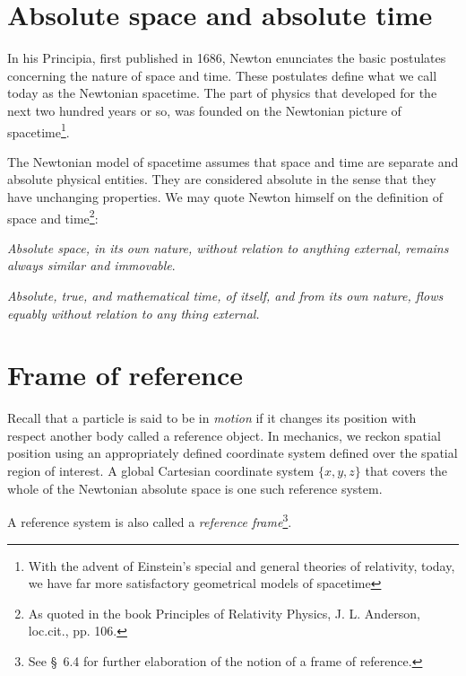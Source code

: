 \section{Absolute space and absolute time}

In his {Principia}, first published in 1686, Newton 
enunciates the basic postulates concerning {the nature 
of 
space and time}. These postulates define what we call 
today 
as the Newtonian spacetime. The part of physics that 
developed for the next two hundred years or so, was 
founded 
on the Newtonian picture of spacetime\footnote{With 
the 
advent of Einstein's special and general theories of 
relativity, today, we have far more satisfactory 
geometrical 
models of spacetime}.

The Newtonian model of spacetime assumes that space and
time are separate and absolute physical entities. They 
are 
considered absolute in the sense that they have 
unchanging
properties. We may quote Newton himself on the 
definition of
space and time\footnote{As quoted in the book 
{Principles of
Relativity Physics}, J. L. Anderson, loc.cit., pp. 
106.}:

{}
\textit{Absolute space, in its own nature, without 
relation
to anything external, remains always similar and
immovable}.

\textit{Absolute, true, and
mathematical time, of itself, and from its own nature, 
flows
equably without relation to any thing external.}

\vspace{-.3cm}

\section{Frame of reference}

Recall that a particle is said to be in \textsl{motion} 
if
it changes its position with respect another body 
called a
reference object. In mechanics, we reckon spatial 
position
using an appropriately defined coordinate system 
defined
over the spatial region of interest. A global Cartesian
coordinate system $\{x,y,z\}$ that covers the whole of 
the
Newtonian absolute space is one such reference system. 
 
A reference system is also called a \textsl{reference 
frame}\footnote{See \S~6.4 for further elaboration of 
the notion of a frame of reference.}.

\vspace{-.3cm}

